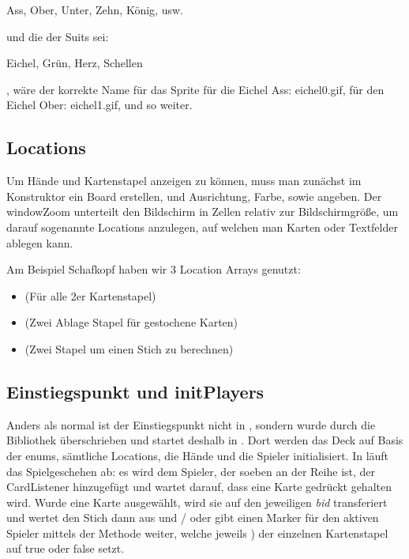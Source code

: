 Ass, Ober, Unter, Zehn, König, usw.

und die der Suits sei:

Eichel, Grün, Herz, Schellen

, wäre der korrekte Name für das Sprite für die Eichel Ass: eichel0.gif, für den
Eichel Ober: eichel1.gif, und so weiter.

\subsection{Locations}

Um Hände und Kartenstapel anzeigen zu können, muss man zunächst im Konstruktor
ein Board erstellen, und Ausrichtung, Farbe, sowie 
angeben. Der windowZoom unterteilt den Bildschirm in Zellen relativ zur
Bildschirmgröße, um darauf sogenannte Locations anzulegen, auf welchen man
Karten oder Textfelder ablegen kann.

Am Beispiel Schafkopf haben wir 3 Location Arrays genutzt:

\begin{itemize}
	\item {} (Für alle 2er Kartenstapel)
	\item {} (Zwei Ablage Stapel für gestochene Karten)
	\item {} (Zwei Stapel um einen Stich zu berechnen)
\end{itemize}

\subsection{Einstiegspunkt und initPlayers}

Anders als normal ist der Einstiegspunkt nicht in , sondern
wurde durch die Bibliothek überschrieben und startet deshalb in .
Dort werden das Deck auf Basis der enums, sämtliche Locations, die Hände und
die Spieler initialisiert. In  läuft das Spielgeschehen ab:
es wird dem Spieler, der soeben an der Reihe ist, der CardListener hinzugefügt
und  wartet darauf, dass eine Karte gedrückt
gehalten wird. Wurde eine Karte ausgewählt, wird sie auf den jeweiligen
\emph{bid} transferiert und  wertet den Stich dann aus und
/ oder gibt einen Marker für den aktiven Spieler mittels der Methode
 weiter, welche jeweils
) der einzelnen Kartenstapel auf true oder false setzt.

